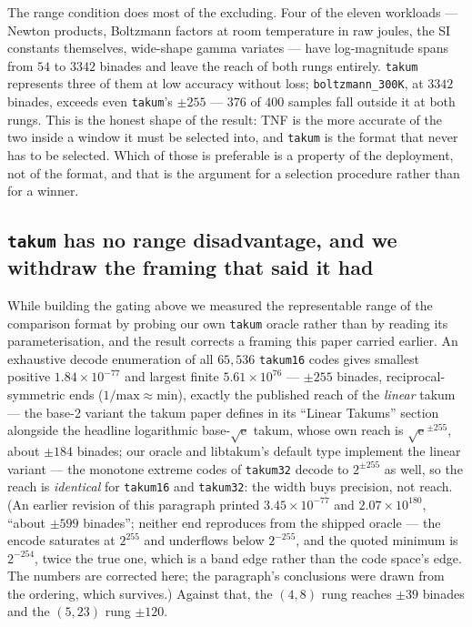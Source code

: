 \documentclass[11pt]{article}
\theoremstyle{definition}
\begin{document}
The range condition does most of the excluding. Four of the eleven workloads ---
Newton products, Boltzmann factors at room temperature in raw joules, the SI
constants themselves, wide-shape gamma variates --- have log-magnitude spans from
$54$ to $3342$ binades and leave the reach of both rungs entirely.
\texttt{takum} represents three of them at low accuracy without loss;
\texttt{boltzmann\_300K}, at $3342$ binades, exceeds even \texttt{takum}'s
$\pm 255$ --- $376$ of $400$ samples fall outside it at both rungs. This is
the honest shape of the result: TNF is the more accurate of the two inside a
window it must be selected into, and \texttt{takum} is the format that never has
to be selected. Which of those is preferable is a property of the deployment, not
of the format, and that is the argument for a selection procedure rather than for
a winner.

\subsection{\texttt{takum} has no range disadvantage, and we withdraw the framing that said it had}
\label{sec:takumrange}

While building the gating above we measured the representable range of the
comparison format by probing our own \texttt{takum} oracle rather than by reading
its parameterisation, and the result corrects a framing this paper carried
earlier. An exhaustive decode enumeration of all $65{,}536$ \texttt{takum16}
codes gives smallest positive $1.84 \times 10^{-77}$ and largest finite
$5.61 \times 10^{76}$ --- $\pm 255$ binades, reciprocal-symmetric ends
($1/\text{max} \approx \text{min}$), exactly the published reach of the
\emph{linear} takum --- the base-2 variant the takum paper defines in its
``Linear Takums'' section alongside the headline logarithmic
base-$\sqrt{\mathrm{e}}$ takum,
whose own reach is $\sqrt{\mathrm{e}}^{\pm 255}$, about $\pm 184$ binades;
our oracle and libtakum's default type implement the linear variant --- the
monotone extreme codes of \texttt{takum32} decode to $2^{\pm 255}$ as well, so
the reach is \emph{identical} for \texttt{takum16} and \texttt{takum32}: the
width buys precision, not reach. (An earlier revision of this paragraph printed
$3.45 \times 10^{-77}$ and $2.07 \times 10^{180}$, ``about $\pm 599$
binades''; neither end reproduces from the shipped oracle --- the encode
saturates at $2^{255}$ and underflows below $2^{-255}$, and the quoted minimum
is $2^{-254}$, twice the true one, which is a band edge rather than the code
space's edge. The numbers are corrected here; the paragraph's conclusions were
drawn from the ordering, which survives.) Against that, the $(4,8)$ rung
reaches $\pm 39$ binades and the $(5,23)$ rung $\pm 120$.
\end{document}

